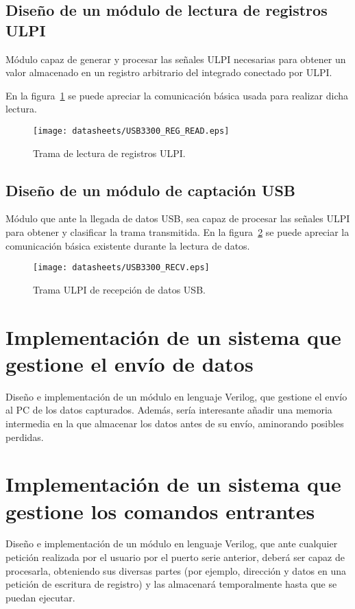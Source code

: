 \subsection{Diseño de un módulo de lectura de registros ULPI}
Módulo capaz de generar y procesar las señales ULPI necesarias para obtener un valor almacenado en un registro arbitrario del integrado conectado por ULPI.

En la figura~\ref{fig:ULPI_REG_READ} se puede apreciar la comunicación básica usada para realizar dicha lectura.
\begin{figure}[hbt]
    \centering
    \texttt{[image: datasheets/USB3300\_REG\_READ.eps]}
    \caption{Trama de lectura de registros ULPI.}
    \label{fig:ULPI_REG_READ}
\end{figure}

\subsection{Diseño de un módulo de captación USB}
Módulo que ante la llegada de datos USB, sea capaz de procesar las señales ULPI para obtener y clasificar la trama transmitida. En la figura~\ref{fig:ULPI_RECV} se puede apreciar la comunicación básica existente durante la lectura de datos.
\begin{figure}[hbt]
    \centering
    \texttt{[image: datasheets/USB3300\_RECV.eps]}
    \caption{Trama ULPI de recepción de datos USB.}
    \label{fig:ULPI_RECV}
\end{figure}



\section{Implementación de un sistema que gestione el envío de datos}
Diseño e implementación de un módulo en lenguaje Verilog, que gestione el envío al PC de los datos capturados. Además, sería interesante añadir una memoria intermedia en la que almacenar los datos antes de su envío, aminorando posibles perdidas.



\section{Implementación de un sistema que gestione los comandos entrantes}
Diseño e implementación de un módulo en lenguaje Verilog, que ante cualquier petición realizada por el usuario por el puerto serie anterior, deberá ser capaz de procesarla, obteniendo sus diversas partes (por ejemplo, dirección y datos en una petición de escritura de registro) y las almacenará temporalmente hasta que se puedan ejecutar.



